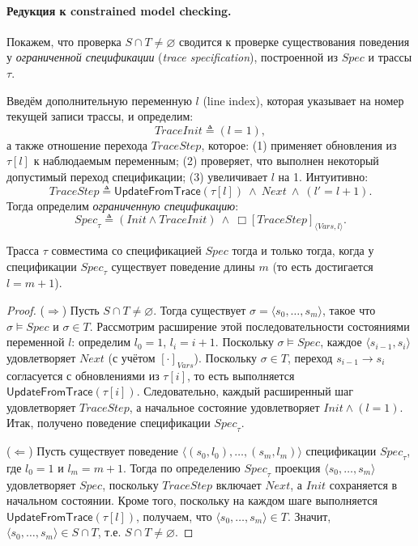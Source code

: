 \paragraph{Редукция к constrained model checking.}
Покажем, что проверка $S \cap T \neq \varnothing$ сводится к проверке
существования поведения у \emph{ограниченной спецификации}
(\emph{trace specification}), построенной из $\mathit{Spec}$ и трассы $\tau$.

Введём дополнительную переменную $l$ (line index), которая указывает на номер
текущей записи трассы, и определим:
\[
\mathit{TraceInit} \triangleq (l = 1),
\]
а также отношение перехода $\mathit{TraceStep}$, которое:
(1) применяет обновления из $\tau[l]$ к наблюдаемым переменным;
(2) проверяет, что выполнен некоторый допустимый переход спецификации;
(3) увеличивает $l$ на 1.
Интуитивно:
\[
\mathit{TraceStep} \triangleq
\mathsf{UpdateFromTrace}(\tau[l]) \ \wedge\ \mathit{Next} \ \wedge\ (l' = l + 1).
\]
Тогда определим \emph{ограниченную спецификацию}:
\[
\mathit{Spec}_\tau \triangleq (\mathit{Init} \wedge \mathit{TraceInit})
\ \wedge\ \Box[\mathit{TraceStep}]_{\langle Vars, l\rangle}.
\]

\begin{theorem}
Трасса $\tau$ совместима со спецификацией $\mathit{Spec}$
тогда и только тогда, когда у спецификации $\mathit{Spec}_\tau$
существует поведение длины $m$ (то есть достигается $l = m+1$).
\end{theorem}

\begin{proof}
($\Rightarrow$) Пусть $S \cap T \neq \varnothing$.
Тогда существует $\sigma=\langle s_0,\dots,s_m\rangle$, такое что
$\sigma \models \mathit{Spec}$ и $\sigma \in T$.
Рассмотрим расширение этой последовательности состояниями переменной $l$:
определим $l_0 = 1$, $l_i = i+1$.
Поскольку $\sigma \models \mathit{Spec}$, каждое $\langle s_{i-1}, s_i\rangle$
удовлетворяет $\mathit{Next}$ (с учётом $[\cdot]_{Vars}$).
Поскольку $\sigma \in T$, переход $s_{i-1}\to s_i$ согласуется с обновлениями
из $\tau[i]$, то есть выполняется $\mathsf{UpdateFromTrace}(\tau[i])$.
Следовательно, каждый расширенный шаг удовлетворяет $\mathit{TraceStep}$,
а начальное состояние удовлетворяет $\mathit{Init}\wedge(l=1)$.
Итак, получено поведение спецификации $\mathit{Spec}_\tau$.

($\Leftarrow$) Пусть существует поведение $\langle (s_0,l_0),\dots,(s_m,l_m)\rangle$
спецификации $\mathit{Spec}_\tau$, где $l_0=1$ и $l_m=m+1$.
Тогда по определению $\mathit{Spec}_\tau$ проекция $\langle s_0,\dots,s_m\rangle$
удовлетворяет $\mathit{Spec}$, поскольку $\mathit{TraceStep}$ включает $\mathit{Next}$,
а $\mathit{Init}$ сохраняется в начальном состоянии.
Кроме того, поскольку на каждом шаге выполняется $\mathsf{UpdateFromTrace}(\tau[l])$,
получаем, что $\langle s_0,\dots,s_m\rangle \in T$.
Значит, $\langle s_0,\dots,s_m\rangle \in S \cap T$, т.е. $S \cap T \neq \varnothing$.
\end{proof}

